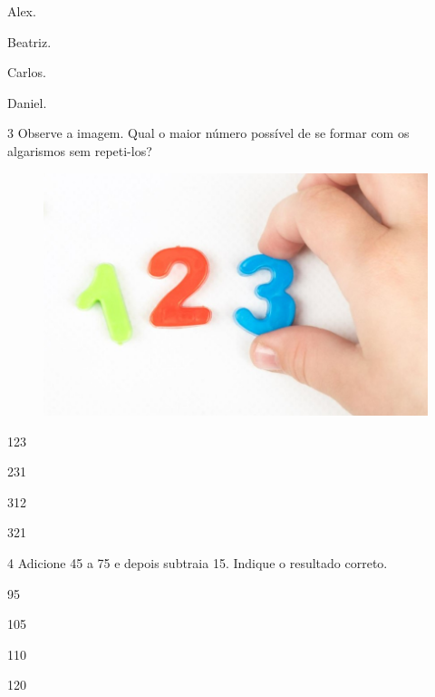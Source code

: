\begin{escolha}
\item Alex.

\item Beatriz.

\item Carlos.

\item Daniel.
\end{escolha}

\pagebreak
\num{3} Observe a imagem. Qual o maior número possível de se formar com os
algarismos sem repeti-los?

\begin{figure}[htpb!]
\includegraphics[width=\textwidth]{./media/image114.png}
\end{figure}

\begin{escolha}
\item 123

\item 231

\item 312

\item 321
\end{escolha}

\num{4} Adicione 45 a 75 e depois subtraia 15. Indique o resultado correto.

\begin{escolha}
\item 95

\item 105

\item 110

\item 120
\end{escolha}

